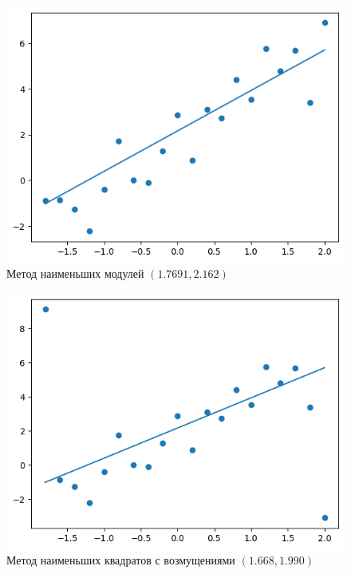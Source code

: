 \documentclass[12pt,a4paper]{article}
\begin{document}
	\begin{figure}[htbp!]
		\begin{center}
			\includegraphics[width = 1\linewidth]{graphics/lab6_abs.png}
			\caption{Метод наименьших модулей \( (1.7691, 2.162) \)}
		\end{center}
	\end{figure}

	\begin{figure}[htbp!]
		\begin{center}
			\includegraphics[width = 1\linewidth]{graphics/lab6_abs_mod.png}
			\caption{Метод наименьших квадратов с возмущениями
				\( (1.668, 1.990) \)}
		\end{center}
	\end{figure}
\end{document}
